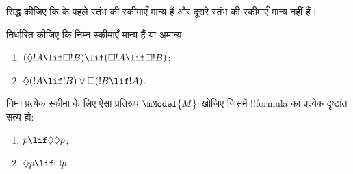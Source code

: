 \documentclass[../../../include/open-logic-section]{subfiles}
\begin{document}
\begin{prob}%
  सिद्ध कीजिए कि  के पहले
  स्तंभ की स्कीमाएँ मान्य हैं और दूसरे स्तंभ की स्कीमाएँ मान्य नहीं हैं।
\end{prob}

\begin{prob}
  निर्धारित कीजिए कि निम्न स्कीमाएँ मान्य हैं या अमान्य:
  \begin{enumerate}
  \item $(\Diamond !A \lif \Box !B) \lif (\Box !A \lif \Box
    !B)$;
  \item $\Diamond(!A \lif !B) \lor \Box(!B \lif !A)$.
  \end{enumerate}
\end{prob}

\begin{prob}
  निम्न प्रत्येक स्कीमा के लिए ऐसा प्रतिरूप $\mModel{M}$ खोजिए जिसमें
  !!{formula} का प्रत्येक दृष्टांत सत्य हो:
  \begin{enumerate}
  \item $p \lif \Diamond\Diamond p$;
  \item $\Diamond p \lif \Box p$.
  \end{enumerate}
\end{prob}
\end{document}

